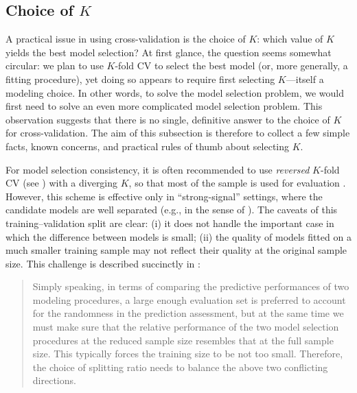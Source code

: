 \documentclass[11pt]{article}
\theoremstyle{plain}
\begin{document}
\subsection{Choice of $K$}\label{subsec:7.2-choose-k}
A practical issue in using cross-validation is the choice of \(K\): which value of \(K\) yields the best model selection? At first glance, the question seems somewhat circular: we plan to use \(K\)-fold CV to select the best model (or, more generally, a fitting procedure), yet doing so appears to require first selecting \(K\)---itself a modeling choice. In other words, to solve the model selection problem, we would first need to solve an even more complicated model selection problem. This observation suggests that there is no single, definitive answer to the choice of \(K\) for cross-validation. The aim of this subsection is therefore to collect a few simple facts, known concerns, and practical rules of thumb about selecting \(K\).

For model selection consistency, it is often recommended to use \emph{reversed} \(K\)-fold CV (see ) with a diverging \(K\), so that most of the sample is used for evaluation \citep{yang2007consistency,zhang2015cross,arlot2010survey}. However, this scheme is effective only in ``strong-signal'' settings, where the candidate models are well separated (e.g., in the sense of ). The caveats of this training--validation split are clear: (i) it does not handle the important case in which the difference between models is small; (ii) the quality of models fitted on a much smaller training sample may not reflect their quality at the original sample size. This challenge is described succinctly in \cite{zhang2015cross}:
\begin{quote}
    Simply speaking, in terms of comparing the predictive performances of two modeling procedures, a large enough evaluation set is preferred to account for the randomness in the prediction assessment, but at the same time we must make sure that the relative performance of the two model selection procedures at the reduced sample size resembles that at the full sample size. This typically forces the training size to be not too small. Therefore, the choice of splitting ratio needs to balance the above two conflicting directions.
\end{quote}
\end{document}
